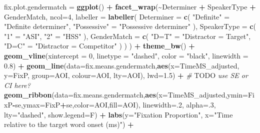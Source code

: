 \documentclass[
]{article}
\newenvironment{Shaded}{\begin{snugshade}}{\end{snugshade}}
\newcommand{\AlertTok}[1]{\textcolor[rgb]{0.94,0.16,0.16}{#1}}
\newcommand{\AttributeTok}[1]{\textcolor[rgb]{0.13,0.29,0.53}{#1}}
\newcommand{\CommentTok}[1]{\textcolor[rgb]{0.56,0.35,0.01}{\textit{#1}}}
\newcommand{\DecValTok}[1]{\textcolor[rgb]{0.00,0.00,0.81}{#1}}
\newcommand{\FloatTok}[1]{\textcolor[rgb]{0.00,0.00,0.81}{#1}}
\newcommand{\FunctionTok}[1]{\textcolor[rgb]{0.13,0.29,0.53}{\textbf{#1}}}
\newcommand{\NormalTok}[1]{#1}
\newcommand{\OtherTok}[1]{\textcolor[rgb]{0.56,0.35,0.01}{#1}}
\newcommand{\SpecialCharTok}[1]{\textcolor[rgb]{0.81,0.36,0.00}{\textbf{#1}}}
\newcommand{\StringTok}[1]{\textcolor[rgb]{0.31,0.60,0.02}{#1}}
\begin{document}
\begin{Shaded}
\begin{Highlighting}[]
\NormalTok{fix.plot.gendermatch }\OtherTok{=} \FunctionTok{ggplot}\NormalTok{() }\SpecialCharTok{+} 
  \FunctionTok{facet\_wrap}\NormalTok{(}\SpecialCharTok{\textasciitilde{}}\NormalTok{Determiner }\SpecialCharTok{+}\NormalTok{ SpeakerType }\SpecialCharTok{+}\NormalTok{ GenderMatch, }\AttributeTok{ncol=}\DecValTok{4}\NormalTok{,}
             \AttributeTok{labeller =} \FunctionTok{labeller}\NormalTok{(}
              \AttributeTok{Determiner =} \FunctionTok{c}\NormalTok{(}
                \StringTok{"Definite"} \OtherTok{=} \StringTok{"Definite determiner"}\NormalTok{,}
                \StringTok{"Possessive"} \OtherTok{=} \StringTok{"Possessive determiner"}
\NormalTok{              ),}
              \AttributeTok{SpeakerType =} \FunctionTok{c}\NormalTok{(}
                \StringTok{"1"} \OtherTok{=} \StringTok{"ASI"}\NormalTok{,}
                \StringTok{"2"} \OtherTok{=} \StringTok{"HSS"}
\NormalTok{              ),}
              \AttributeTok{GenderMatch =} \FunctionTok{c}\NormalTok{(}
                \StringTok{"D=T"} \OtherTok{=} \StringTok{"Distractor = Target"}\NormalTok{,}
                \StringTok{"D=C"} \OtherTok{=} \StringTok{"Distractor = Competitor"}
\NormalTok{              )}
\NormalTok{            )}
\NormalTok{             ) }\SpecialCharTok{+} \FunctionTok{theme\_bw}\NormalTok{() }\SpecialCharTok{+} 
  \FunctionTok{geom\_vline}\NormalTok{(}\AttributeTok{xintercept =} \DecValTok{0}\NormalTok{, }\AttributeTok{linetype =} \StringTok{"dashed"}\NormalTok{, }\AttributeTok{color =} \StringTok{"black"}\NormalTok{, }\AttributeTok{linewidth =} \FloatTok{0.8}\NormalTok{) }\SpecialCharTok{+}
  \FunctionTok{geom\_line}\NormalTok{(}\AttributeTok{data=}\NormalTok{fix.means.gendermatch,}\FunctionTok{aes}\NormalTok{(}\AttributeTok{x=}\NormalTok{TimeMS\_adjusted, }\AttributeTok{y=}\NormalTok{FixP, }\AttributeTok{group=}\NormalTok{AOI, }\AttributeTok{colour=}\NormalTok{AOI, }\AttributeTok{lty=}\NormalTok{AOI), }\AttributeTok{lwd=}\FloatTok{1.5}\NormalTok{) }\SpecialCharTok{+} \CommentTok{\# }\AlertTok{TODO}\CommentTok{ use SE or CI here?}
  \FunctionTok{geom\_ribbon}\NormalTok{(}\AttributeTok{data=}\NormalTok{fix.means.gendermatch,}\FunctionTok{aes}\NormalTok{(}\AttributeTok{x=}\NormalTok{TimeMS\_adjusted,}\AttributeTok{ymin=}\NormalTok{FixP}\SpecialCharTok{{-}}\NormalTok{se,}\AttributeTok{ymax=}\NormalTok{FixP}\SpecialCharTok{+}\NormalTok{se,}\AttributeTok{color=}\NormalTok{AOI,}\AttributeTok{fill=}\NormalTok{AOI), }\AttributeTok{linewidth=}\NormalTok{.}\DecValTok{2}\NormalTok{, }\AttributeTok{alpha=}\NormalTok{.}\DecValTok{3}\NormalTok{, }\AttributeTok{lty=}\StringTok{"dashed"}\NormalTok{, }\AttributeTok{show.legend=}\NormalTok{F)  }\SpecialCharTok{+}
  \FunctionTok{labs}\NormalTok{(}\AttributeTok{y=}\StringTok{"Fixation Proportion"}\NormalTok{, }\AttributeTok{x=}\StringTok{"Time relative to the target word onset (ms)"}\NormalTok{) }\SpecialCharTok{+} 
  

\end{Highlighting}
\end{Shaded}
\end{document}
